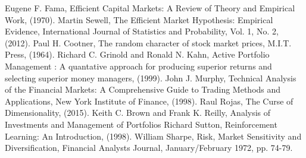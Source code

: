 \documentclass[dvips,12pt]{article}
\begin{document}
\begin{thebibliography}{99}

 Eugene F. Fama,
{Efficient Capital Markets: A Review of Theory and Empirical Work}, (1970).
 Martin Sewell,
{The Efficient Market Hypothesis: Empirical Evidence}, 
International Journal of Statistics and Probability, Vol. 1, No. 2, (2012).
 Paul H. Cootner,
{The random character of stock market prices},
M.I.T. Press, (1964).
 Richard C. Grinold and Ronald N. Kahn,
{Active Portfolio Management : A quantative approach for producing superior returns and selecting superior money managers}, (1999).
 John J. Murphy,
{Technical Analysis of the Financial Markets: A Comprehensive Guide to Trading Methods and Applications},
New York Institute of Finance, (1998).
 Raul Rojas,
{The Curse of Dimensionality}, (2015).
 Keith C. Brown and Frank K. Reilly,
{Analysis of Investments and Management of Portfolios}
 Richard Sutton,
{Reinforcement Learning: An Introduction}, (1998).
 William Sharpe, 
{Risk, Market Sensitivity and Diversification}, Financial Analysts Journal, January/February 1972, pp. 74-79.
\end{thebibliography}
\end{document}
